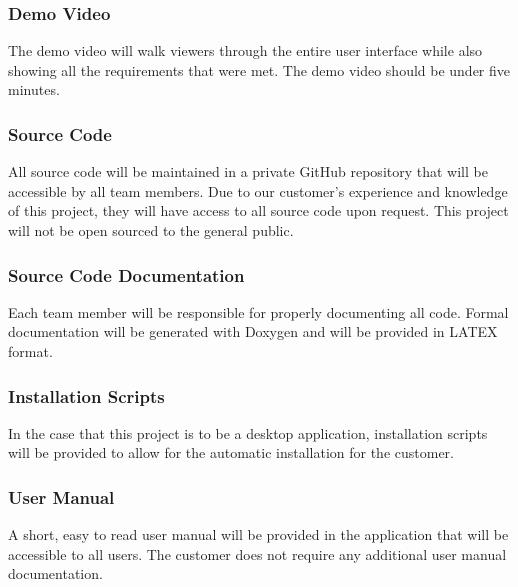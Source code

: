 \subsubsection{Demo Video}
The demo video will walk viewers through the entire user interface while also showing all the requirements that were met. The demo video should be under five minutes.

\subsubsection{Source Code}
All source code will be maintained in a private GitHub repository that will be accessible by all team members. Due to our customer's experience and knowledge of this project, they will have access to all source code upon request. This project will not be open sourced to the general public.

\subsubsection{Source Code Documentation}
Each team member will be responsible for properly documenting all code. Formal documentation will be generated with Doxygen and will be provided in LATEX format.

\subsubsection{Installation Scripts}
 In the case that this project is to be a desktop application, installation scripts will be provided to allow for the automatic installation for the customer.

\subsubsection{User Manual}
A short, easy to read user manual will be provided in the application that will be accessible to all users. The customer does not require any additional user manual documentation.
